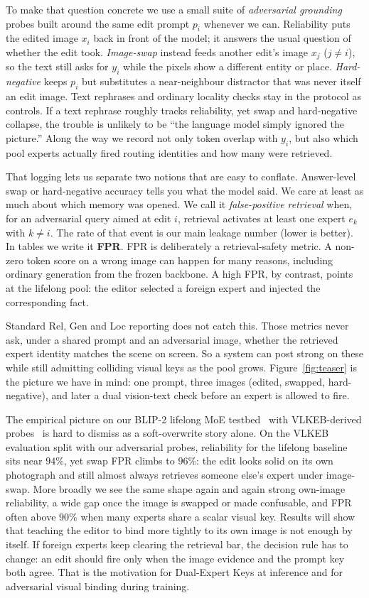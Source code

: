 \documentclass[letterpaper]{article} %
\begin{document}
To make that question concrete we use a small suite of \emph{adversarial grounding} probes built around the same edit prompt $p_i$ whenever we can.
Reliability puts the edited image $x_i$ back in front of the model; it answers the usual question of whether the edit took.
\emph{Image-swap} instead feeds another edit's image $x_j$ ($j\neq i$), so the text still asks for $y_i$ while the pixels show a different entity or place.
\emph{Hard-negative} keeps $p_i$ but substitutes a near-neighbour distractor that was never itself an edit image.
Text rephrases and ordinary locality checks stay in the protocol as controls.
If a text rephrase roughly tracks reliability, yet swap and hard-negative collapse, the trouble is unlikely to be ``the language model simply ignored the picture.''
Along the way we record not only token overlap with $y_i$, but also which pool experts actually fired routing identities and how many were retrieved.

That logging lets us separate two notions that are easy to conflate.
Answer-level swap or hard-negative accuracy tells you what the model said.
We care at least as much about which memory was opened.
We call it \emph{false-positive retrieval} when, for an adversarial query aimed at edit $i$, retrieval activates at least one expert $e_k$ with $k\neq i$.
The rate of that event is our main leakage number (lower is better).
In tables we write it \textbf{FPR}.
FPR is deliberately a retrieval-safety metric.
A non-zero token score on a wrong image can happen for many reasons, including ordinary generation from the frozen backbone.
A high FPR, by contrast, points at the lifelong pool: the editor selected a foreign expert and injected the corresponding fact.

Standard Rel, Gen and Loc reporting does not catch this.
Those metrics never ask, under a shared prompt and an adversarial image, whether the retrieved expert identity matches the scene on screen.
So a system can post strong on these while still admitting colliding visual keys as the pool grows.
Figure~\ref{fig:teaser} is the picture we have in mind: one prompt, three images (edited, swapped, hard-negative), and later a dual vision-text check before an expert is allowed to fire.

The empirical picture on our BLIP-2 lifelong MoE testbed~\cite{li2023blip2,chen2025liveedit} with VLKEB-derived probes~\cite{huang2024vlkeb} is hard to dismiss as a soft-overwrite story alone.
On the VLKEB evaluation split with our adversarial probes, reliability for the lifelong baseline sits near $94\%$, yet swap FPR climbs to $96\%$: the edit looks solid on its own photograph and still almost always retrieves someone else's expert under image-swap.
More broadly we see the same shape again and again strong own-image reliability, a wide gap once the image is swapped or made confusable, and FPR often above $90\%$ when many experts share a scalar visual key.
Results will show that teaching the editor to bind more tightly to its own image is not enough by itself.
If foreign experts keep clearing the retrieval bar, the decision rule has to change: an edit should fire only when the image evidence and the prompt key both agree.
That is the motivation for Dual-Expert Keys at inference and for adversarial visual binding during training.
\end{document}
